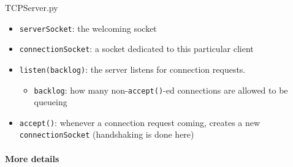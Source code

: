 \begin{frame}{TCPServer.py}
  \begin{center}
  \end{center}
  \begin{footnotesize}
    \begin{itemize}
    \item \texttt{serverSocket}: the welcoming socket
    \item \texttt{connectionSocket}: a socket dedicated to this particular client
    \item \texttt{listen(backlog)}: the server listens for connection requests.
      \begin{itemize}
      \item \texttt{backlog}: {\scriptsize how many non-\texttt{accept()}-ed connections
          are allowed to be queueing}
      \end{itemize}
    \item \texttt{accept()}: whenever a connection request coming, creates a new
      \texttt{connectionSocket} (handshaking is done here)
    \end{itemize}
  \end{footnotesize}
\end{frame}

\paragraph{More details}

